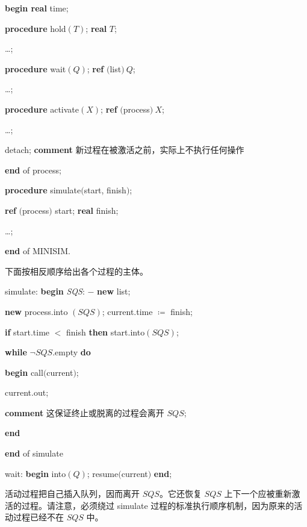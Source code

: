 \quad \quad \quad \quad \textbf{begin real} time;

\quad \quad \quad \quad \quad \textbf{procedure} hold$(T)$; \textbf{real} $T$;

\quad \quad \quad \quad \quad \quad \dots;

\quad \quad \quad \quad \quad \textbf{procedure} wait$(Q)$; \textbf{ref} $($list$)\ Q$;

\quad \quad \quad \quad \quad \quad \dots;

\quad \quad \quad \quad \quad \textbf{procedure} activate$(X)$; \textbf{ref} $($process$)\ X$;

\quad \quad \quad \quad \quad \quad \dots;

\parindent\quad \quad \quad \quad \quad detach; \textbf{comment} 新过程在被激活之前，实际上不执行任何操作

\quad \quad \quad \quad \textbf{end} of process;

\quad \quad \quad \textbf{procedure} simulate$($start, finish$)$;

\quad \quad \quad \quad \textbf{ref} $($process$)$ start; \textbf{real} finish;

\quad \quad \quad \quad \quad \dots;

\quad \quad \textbf{end} of MINISIM.

\noindent
下面按相反顺序给出各个过程的主体。

\quad simulate: \textbf{begin} \textit{SQS}: $-$ \textbf{new} list;

\quad \quad \textbf{new} process.into $(SQS)$; current.time $\coloneq$ finish;

\quad \quad \quad \textbf{if} start.time $<$ finish \textbf{then} start.into$(SQS)$;

\quad \quad \quad \textbf{while} $\neg SQS$.empty \textbf{do}

\quad \quad \quad \quad \textbf{begin} call$($current$)$;

\quad \quad \quad \quad \quad current.out;

\parindent\quad \quad \quad \quad \quad \textbf{comment} 这保证终止或脱离的过程会离开 $SQS$;

\quad \quad \quad \quad \textbf{end}

\quad \quad \textbf{end} of simulate

\quad wait: \textbf{begin} into$(Q)$; resume$($current$)$ \textbf{end};

\noindent
活动过程把自己插入队列，因而离开 $SQS$。它还恢复 $SQS$ 上下一个应被重新激活的过程。请注意，必须绕过 simulate 过程的标准执行顺序机制，因为原来的活动过程已经不在 $SQS$ 中。

